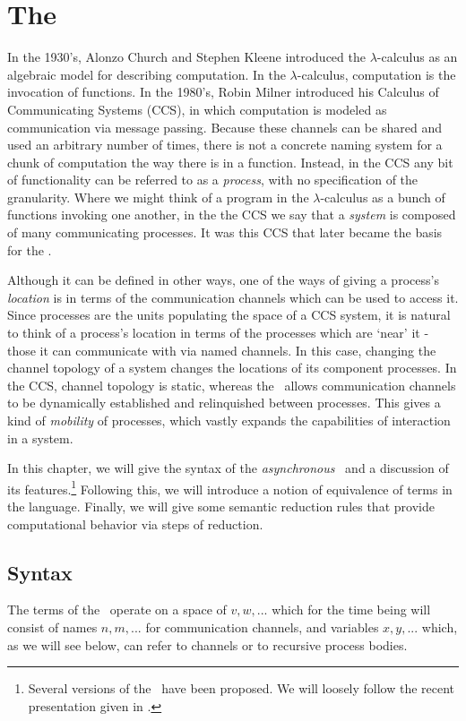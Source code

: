 
\chapter{The \Picalc}\label{the picalc}
	In the 1930's, Alonzo Church and Stephen Kleene introduced the $\lambda$-calculus as an algebraic model for describing computation.  In the $\lambda$-calculus, computation is the invocation of functions.  In the 1980's, Robin Milner introduced his Calculus of Communicating Systems (CCS), in which computation is modeled as communication via message passing.  Because these channels can be shared and used an arbitrary number of times, there is not a concrete naming system for a chunk of computation the way there is in a function.  Instead, in the CCS any bit of functionality can be referred to as a \emph{process}, with no specification of the granularity.  Where we might think of a program in the $\lambda$-calculus as a bunch of functions invoking one another, in the the CCS we say that a \emph{system} is composed of many communicating processes.  It was this CCS that later became the basis for the \picalc.  
	
Although it can be defined in other ways, one of the ways of giving a process's \emph{location} is in terms of the communication channels which can be used to access it.  Since processes are the units populating the space of a CCS system, it is natural to think of a process's location in terms of the processes which are `near' it - those it can communicate with via named channels.  In this case, changing the channel topology of a system changes the locations of its component processes.  In the CCS, channel topology is static, whereas the \picalc\ allows communication channels to be dynamically established and relinquished between processes.  This gives a kind of \emph{mobility} of processes, which vastly expands the capabilities of interaction in a system.
	
	In this chapter, we will give the syntax of the \emph{asynchronous} \picalc\ and a discussion of its features.\footnote{Several versions of the \picalc\ have been proposed.  We will loosely follow the recent presentation given in \cite{henn07}.}  Following this, we will introduce a notion of equivalence of terms in the language.  Finally, we will give some semantic reduction rules that provide computational behavior via steps of reduction.
	\section{Syntax}
	The terms of the \picalc\ operate on a space of  $v,w,...$ which for the time being will consist of names $n,m,...$ for communication channels, and variables $x,y,...$ which, as we will see below, can refer to channels or to recursive process bodies.
	
